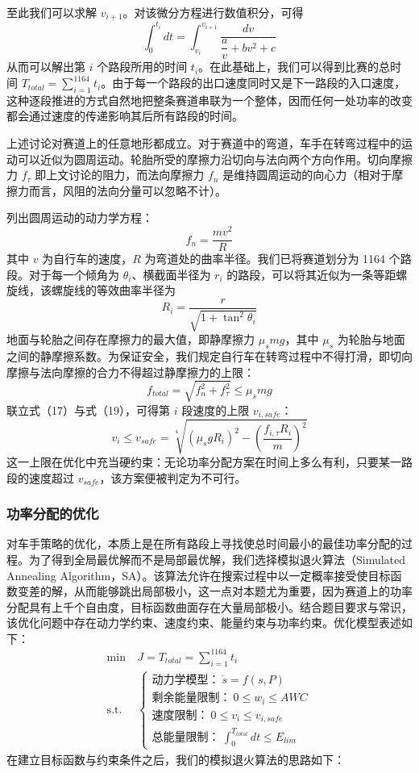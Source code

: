 \documentclass[11pt,a4paper]{ctexart}
\begin{document}
至此我们可以求解 $v_{i+1}$。对该微分方程进行数值积分，可得
\[
\int_0^{t_i}dt=\int_{v_i}^{v_{i+1}}\frac{dv}{\dfrac{a}{v}+bv^2+c}
\]
从而可以解出第 $i$ 个路段所用的时间 $t_i$。在此基础上，我们可以得到比赛的总时间 $T_{total}=\sum_{i=1}^{1164}t_i$。由于每一个路段的出口速度同时又是下一路段的入口速度，这种逐段推进的方式自然地把整条赛道串联为一个整体，因而任何一处功率的改变都会通过速度的传递影响其后所有路段的时间。

上述讨论对赛道上的任意地形都成立。对于赛道中的弯道，车手在转弯过程中的运动可以近似为圆周运动。轮胎所受的摩擦力沿切向与法向两个方向作用。切向摩擦力 $f_{\tau}$ 即上文讨论的阻力，而法向摩擦力 $f_n$ 是维持圆周运动的向心力（相对于摩擦力而言，风阻的法向分量可以忽略不计）。

列出圆周运动的动力学方程：
\[
f_n=\frac{mv^2}{R}
\]
其中 $v$ 为自行车的速度，$R$ 为弯道处的曲率半径。我们已将赛道划分为 1164 个路段。对于每一个倾角为 $\theta_i$、横截面半径为 $r_i$ 的路段，可以将其近似为一条等距螺旋线，该螺旋线的等效曲率半径为
\[
R_i=\frac{r}{\sqrt{1+\tan^2\theta_i}}
\]
地面与轮胎之间存在摩擦力的最大值，即静摩擦力 $\mu_s mg$，其中 $\mu_s$ 为轮胎与地面之间的静摩擦系数。为保证安全，我们规定自行车在转弯过程中不得打滑，即切向摩擦与法向摩擦的合力不得超过静摩擦力的上限：
\[
f_{total}=\sqrt{f_n^2+f_{\tau}^2}\le\mu_s mg
\]
联立式（17）与式（19），可得第 $i$ 段速度的上限 $v_{i,safe}$：
\[
v_i\le v_{safe}=\sqrt[4]{\left(\mu_s gR_i\right)^2-\left(\frac{f_{i,\tau}R_i}{m}\right)^2}
\]
这一上限在优化中充当硬约束：无论功率分配方案在时间上多么有利，只要某一路段的速度超过 $v_{safe}$，该方案便被判定为不可行。

\subsubsection{功率分配的优化}

对车手策略的优化，本质上是在所有路段上寻找使总时间最小的最佳功率分配的过程。为了得到全局最优解而不是局部最优解，我们选择模拟退火算法（Simulated Annealing Algorithm，SA）。该算法允许在搜索过程中以一定概率接受使目标函数变差的解，从而能够跳出局部极小，这一点对本题尤为重要，因为赛道上的功率分配具有上千个自由度，目标函数曲面存在大量局部极小。结合题目要求与常识，该优化问题中存在动力学约束、速度约束、能量约束与功率约束。优化模型表述如下：
\[
\begin{aligned}
\min\ & J=T_{total}=\sum_{i=1}^{1164}t_i\\
\text{s.t.}\ &
\begin{cases}
\text{动力学模型：}\ \dot{s}=f(s,P)\\
\text{剩余能量限制：}\ 0\le w_i\le AWC\\
\text{速度限制：}\ 0\le v_i\le v_{i,safe}\\
\text{总能量限制：}\ \displaystyle\int_0^{T_{total}}dt\le E_{lim}
\end{cases}
\end{aligned}
\]
在建立目标函数与约束条件之后，我们的模拟退火算法的思路如下：
\end{document}
